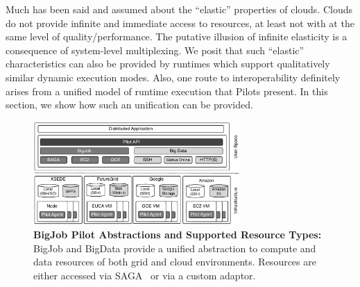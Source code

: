 \documentclass[times]{cpeauth}
\newcommand{\pilots}{Pilots\xspace}
\begin{document}

Much has been said and assumed about the ``elastic'' properties of
clouds. Clouds do not provide infinite and immediate access to
resources, at least not with at the same level of
quality/performance. The putative illusion of infinite elasticity is a
consequence of system-level multiplexing. We posit that such
``elastic'' characteristics can also be provided by runtimes which
support qualitatively similar dynamic execution modes.  Also, one
route to interoperability definitely arises from a unified model of
runtime execution that \pilots present.  In this section, we show how
such an unification can be provided.


\begin{figure}[t]
	\centering
		\includegraphics[width=0.7\textwidth]{figures/cloud_pilot_job.pdf}
                \caption{\textbf{BigJob Pilot Abstractions and
                    Supported Resource Types:} BigJob and BigData
                  provide a unified abstraction to compute and data
                  resources of both grid and cloud
                  environments. Resources are either accessed via
                  SAGA~\cite{ogf-gfd-90,saga-bliss-pd} or via a custom
                  adaptor.}
	\label{fig:figures_cloud_pilot_job}
\end{figure}
\end{document}
